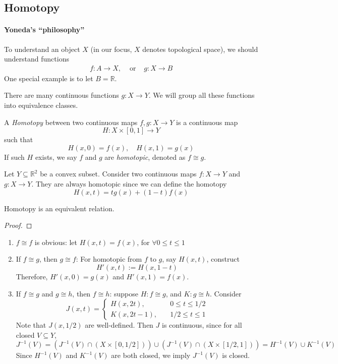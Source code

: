\subsection{Homotopy}
\paragraph{Yoneda's ``philosophy''}
To understand an object $X$ (in our focus, $X$ denotes topological space), we should understand functions
\[
\begin{array}{lll}
f:A\to X,
&
\text{ or }
&
g:X\to B
\end{array}
\]
One special example is to let $B=\mathbb{R}$.

There are many continuous functions $g:X\to Y$.
We will group all these functions into equivalence classes.

\begin{definition}[Homotopy]
A \emph{Homotopy} between two continuous maps $f,g:X\to Y$ is a continuous map
\[
H:X\times[0,1]\to Y
\]
such that 
\[
H(x,0)=f(x),\quad
H(x,1)=g(x)
\]
If such $H$ exists, we say $f$ and $g$ are \emph{homotopic}, denoted as $f\cong g$.
\end{definition}

\begin{example}
Let $Y\subseteq\mathbb{R}^2$ be a convex subset.
Consider two continuous maps $f:X\to Y$ and $g:X\to Y$.
They are always homotopic since we can define the homotopy
\[
H(x,t) = tg(x) + (1-t)f(x)
\]
\end{example}

\begin{proposition}
Homotopy is an equivalent relation.
\end{proposition}
\begin{proof}
\end{proof}






\begin{enumerate}
\item
$f\cong f$ is obvious: let $H(x,t) = f(x)$, for $\forall 0\le t\le1$
\item
If $f\cong g$, then $g\cong f$:
For homotopic from $f$ to $g$, say $H(x,t)$, construct
\[
H'(x,t):=H(x,1-t)
\]
Therefore, $H'(x,0)=g(x)$ and $H'(x,1)=f(x)$.
\item
If $f\cong g$ and $g\cong h$, then $f\cong h$:
suppose $H:f\cong g$, and $K:g\cong h$.
Consider
\[
J(x,t)=\left\{
\begin{aligned}
H(x,2t),&\quad 0\le t\le1/2\\
K(x,2t-1),&\quad 1/2\le t\le 1
\end{aligned}
\right.
\]
Note that $J(x,1/2)$ are well-defined.
Then $J$ is continuous, since for all closed $V\subseteq Y$,
\[
J^{-1}(V)=(J^{-1}(V)\cap(X\times[0,1/2]))\cup(J^{-1}(V)\cap(X\times[1/2,1]))
=
H^{-1}(V)\cup K^{-1}(V)
\]
Since $H^{-1}(V)$ and $K^{-1}(V)$ are both closed, we imply $J^{-1}(V)$ is closed.
\end{enumerate}

